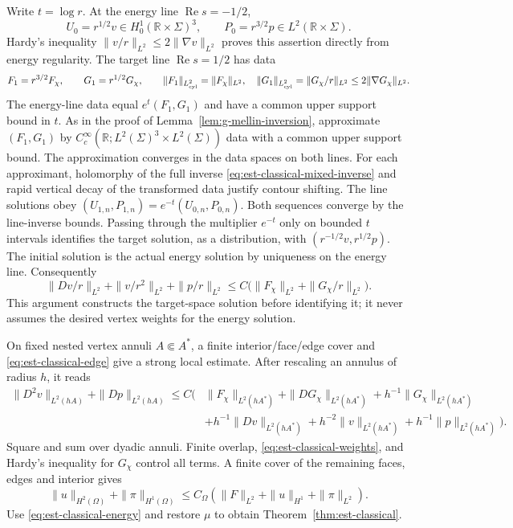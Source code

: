 \documentclass[11pt,a4paper]{article}
\theoremstyle{remark}
\numberwithin{equation}{section}
\begin{document}
Write $t=\log r$. At the energy line $\operatorname{Re}s=-1/2$,
\[
 U_0=r^{1/2}v\in H_0^1(\mathbb R\times\Sigma)^3,
 \qquad P_0=r^{3/2}p\in L^2(\mathbb R\times\Sigma).
\]
Hardy's inequality $\|v/r\|_{L^2}\le2\|\nabla v\|_{L^2}$ proves
this assertion directly from energy regularity. The target line
$\operatorname{Re}s=1/2$ has data
\[
 F_1=r^{3/2}F_\chi,
 \qquad G_1=r^{1/2}G_\chi,
 \qquad
 \|F_1\|_{L^2_{\rm cyl}}=\|F_\chi\|_{L^2},\quad
 \|G_1\|_{L^2_{\rm cyl}}=\|G_\chi/r\|_{L^2}
 \le2\|\nabla G_\chi\|_{L^2}.
\]
The energy-line data equal $e^t(F_1,G_1)$ and have a common upper
support bound in $t$. As in the proof of Lemma~\ref{lem:g-mellin-inversion}, approximate
$(F_1,G_1)$ by
$C_c^\infty(\mathbb R;L^2(\Sigma)^3\times L^2(\Sigma))$ data
with a common upper support bound. The approximation converges in the
data spaces on both lines. For each approximant,
holomorphy of the full inverse
\eqref{eq:est-classical-mixed-inverse} and rapid vertical decay of the
transformed data justify contour shifting. The line solutions obey
$(U_{1,n},P_{1,n})=e^{-t}(U_{0,n},P_{0,n})$.
Both sequences converge by the line-inverse bounds. Passing through the
multiplier $e^{-t}$ only on bounded $t$ intervals identifies the target
solution, as a distribution, with
$(r^{-1/2}v,r^{1/2}p)$. The initial solution is the actual energy solution
by uniqueness on the energy line. Consequently
\begin{equation}\label{eq:est-classical-weights}
 \|Dv/r\|_{L^2}+\|v/r^2\|_{L^2}+\|p/r\|_{L^2}
 \le C\bigl(\|F_\chi\|_{L^2}+\|G_\chi/r\|_{L^2}\bigr).
\end{equation}
This argument constructs the target-space solution before identifying it;
it never assumes the desired vertex weights for the energy solution.

On fixed nested vertex annuli $A\Subset A^*$, a finite interior/face/edge
cover and \eqref{eq:est-classical-edge} give a strong local estimate.
After rescaling an annulus of radius $h$, it reads
\begin{align*}
 \|D^2v\|_{L^2(hA)}+\|Dp\|_{L^2(hA)}
 \le C\bigl(&\|F_\chi\|_{L^2(hA^*)}+\|DG_\chi\|_{L^2(hA^*)}
       +h^{-1}\|G_\chi\|_{L^2(hA^*)}\\
 &+h^{-1}\|Dv\|_{L^2(hA^*)}+h^{-2}\|v\|_{L^2(hA^*)}
       +h^{-1}\|p\|_{L^2(hA^*)}\bigr).
\end{align*}
Square and sum over dyadic annuli. Finite overlap,
\eqref{eq:est-classical-weights}, and Hardy's inequality for $G_\chi$
control all terms. A finite cover of the remaining faces, edges and
interior gives
\[
 \|u\|_{H^2(\Omega)}+\|\pi\|_{H^1(\Omega)}
 \le C_\Omega(\|F\|_{L^2}+\|u\|_{H^1}+\|\pi\|_{L^2}).
\]
Use \eqref{eq:est-classical-energy} and restore $\mu$ to obtain
Theorem~\ref{thm:est-classical}.
\end{document}
